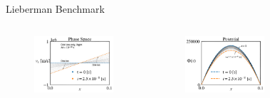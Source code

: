 \documentclass[aspectratio=169, 16pt]{beamer}
\begin{document}
\begin{frame}{Lieberman Benchmark}
  \vfill{}
  \begin{columns}
    \begin{figure}[H]
      \centering
      \includegraphics[width=\textwidth]{figs/lieberman_vdf_comparison.png}
    \end{figure}
    \begin{figure}[H]
      \centering
      \includegraphics[width=\textwidth]{figs/lieberman_potential_comparison.png}
    \end{figure}
    \begin{figure}[H]
      \centering

\end{figure}
\end{columns}
\end{frame}
\end{document}
